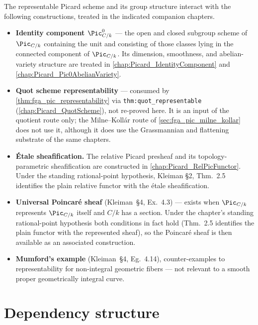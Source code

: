 The representable Picard scheme and its group structure interact with the
following constructions, treated in the indicated companion chapters.
\begin{itemize}
  \item \textbf{Identity component \(\Pic^0_{C/k}\)} --- the open and
    closed subgroup scheme of \(\Pic_{C/k}\) containing the unit and
    consisting of those classes lying in the connected component of
    \(\Pic_{C/k}\). Its dimension, smoothness, and abelian-variety
    structure are treated in \cref{chap:Picard_IdentityComponent} and
    \cref{chap:Picard_Pic0AbelianVariety}.
  \item \textbf{Quot scheme representability} --- consumed by
    \cref{thm:fga_pic_representability} via \texttt{thm:quot\_representable}
    (\cref{chap:Picard_QuotScheme}), not re-proved here. It is an input of the
    quotient route only; the Milne--Koll\'ar route of
    \cref{sec:fga_pic_milne_kollar} does not use it, although it does use the
    Grassmannian and flattening substrate of the same chapters.
  \item \textbf{\'Etale sheafification.} The relative Picard presheaf and its
    topology-parametric sheafification are constructed in
    \cref{chap:Picard_RelPicFunctor}. Under the
    standing rational-point hypothesis, Kleiman \S 2, Thm.~2.5 identifies
    the plain relative functor with the \'etale sheafification.
  \item \textbf{Universal Poincar\'e sheaf} (Kleiman~\S 4, Ex.~4.3)
    --- exists when \(\Pic_{C/k}\) represents \(\Pic_{C/k}\) itself and
    \(C/k\) has a section. Under the chapter's standing rational-point
    hypothesis both conditions in fact hold (Thm.~2.5 identifies the
    plain functor with the represented sheaf), so the Poincar\'e sheaf
    is then available as an associated construction.
  \item \textbf{Mumford's example} (Kleiman~\S 4, Eg.~4.14), counter-examples
    to representability for non-integral geometric fibers --- not
    relevant to a smooth proper geometrically integral curve.
\end{itemize}

\section{Dependency structure}
\label{sec:fga_pic_consistency_check}

